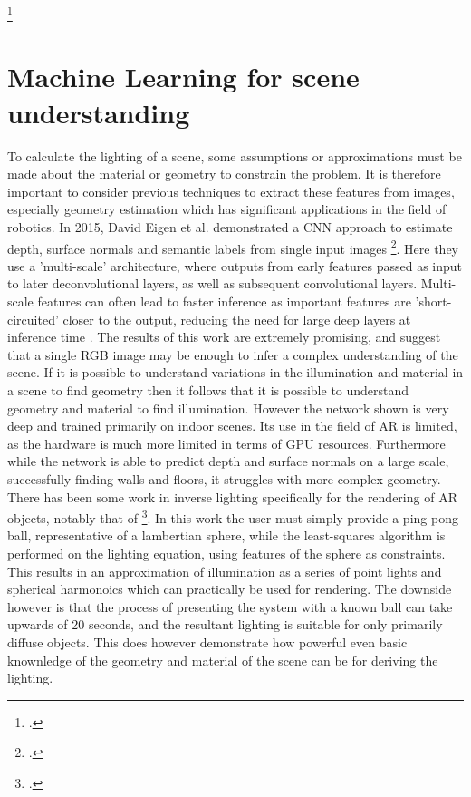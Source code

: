\documentclass[ %
                    author={Gavin Parker},
                supervisor={Dr. Neill Campbell},
                    degree={MEng},
                     title={Deep Siamese Networks for Illumination Estimation from Stereo Images},
                  subtitle={},
                      type={research},
                      year={2018} ]{dissertation}
\begin{document}
\footcite{http://ieeexplore.ieee.org/stamp/stamp.jsp?tp=&arnumber=790313}
\section{Machine Learning for scene understanding}
To calculate the lighting of a scene, some assumptions or approximations must be made about the material or geometry to constrain the problem. It is therefore important to consider previous techniques to extract these features from images, especially geometry estimation which has significant applications in the field of robotics. In 2015, David Eigen et al. demonstrated a CNN approach to estimate depth, surface normals and semantic labels from single input images \footcite{https://arxiv.org/pdf/1411.4734.pdf}. Here they use a 'multi-scale' architecture, where outputs from early features passed as input to later deconvolutional layers, as well as subsequent convolutional layers. Multi-scale features can often lead to faster inference as important features are 'short-circuited' closer to the output, reducing the need for large deep layers at inference time . The results of this work are extremely promising, and suggest that a single RGB image may be enough to infer a complex understanding of the scene. If it is possible to understand variations in the illumination and material in a scene to find geometry then it follows that it is possible to understand geometry and material to find illumination.  However the network shown is very deep and trained primarily on indoor scenes. Its use in the field of AR is limited, as the hardware is much more limited in terms of GPU resources. Furthermore while the network is able to predict depth and surface normals on a large scale, successfully finding walls and floors, it struggles with more complex geometry.
\newline
There has been some work in inverse lighting specifically for the rendering of AR objects, notably that of \footcite{https://link.springer.com/content/pdf/10.1007/s00371-010-0501-7.pdf}. In this work the user must simply provide a ping-pong ball, representative of a lambertian sphere, while the least-squares algorithm is performed on the lighting equation, using features of the sphere as constraints. This results in an approximation of illumination as a series of point lights and spherical harmonoics which can practically be used for rendering. The downside however is that the process of presenting the system with a known ball can take upwards of 20 seconds, and the resultant lighting is suitable for only primarily diffuse objects. This does however demonstrate how powerful even basic knownledge of the geometry and material of the scene can be for deriving the lighting.
\end{document}
